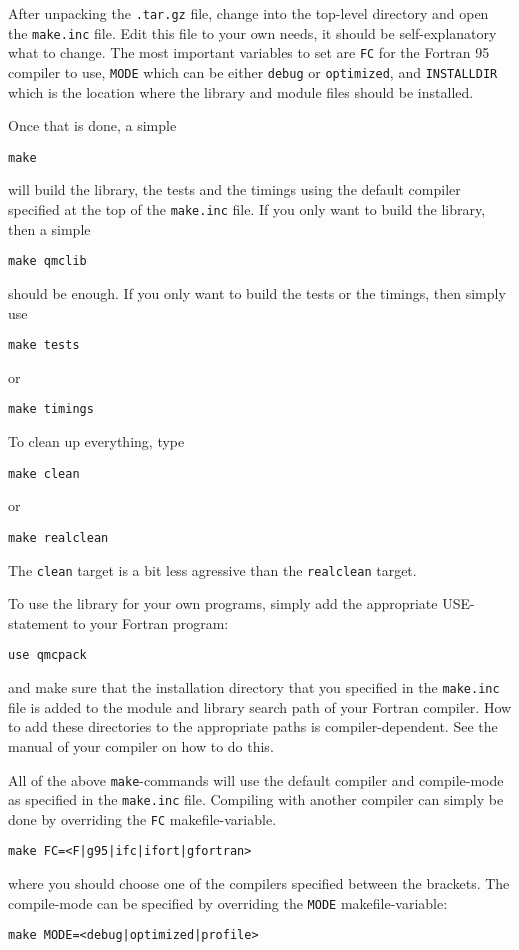 After unpacking the \verb!.tar.gz! file, change into the top-level directory
and open the \verb|make.inc| file.  Edit this file to your own needs, it should
be self-explanatory what to change.  The most important variables to set are
\verb!FC! for the Fortran 95 compiler to use, \verb!MODE! which can be either
\verb!debug! or \verb!optimized!, and \verb!INSTALLDIR! which is the location
where the library and module files should be installed.

Once that is done, a simple
\begin{verbatim}
make
\end{verbatim}
will build the library, the tests and the timings using the default compiler
specified at the top of the \verb!make.inc! file.
If you only want to build the library, then a simple
\begin{verbatim}
make qmclib
\end{verbatim}
should be enough.  If you only want to build the tests or the timings, then
simply use
\begin{verbatim}
make tests
\end{verbatim}
or
\begin{verbatim}
make timings
\end{verbatim}
To clean up everything, type
\begin{verbatim}
make clean
\end{verbatim}
or
\begin{verbatim}
make realclean
\end{verbatim}
The \verb!clean! target is a bit less agressive than the \verb!realclean!
target.

To use the \qmcpack{} library for your own programs, simply add the appropriate
USE-statement to your Fortran program:
\begin{verbatim}
use qmcpack
\end{verbatim}
and make sure that the \qmcpack{} installation directory that you specified in
the \verb!make.inc! file is added to the module and
library search path of your Fortran compiler.  How to add these directories to the appropriate paths is
compiler-dependent.  See the manual of your compiler on how to do this.

All of the above \verb!make!-commands will use the default compiler and
compile-mode as specified in the \verb!make.inc! file.
Compiling with another compiler can simply be done by overriding the \verb!FC!
makefile-variable.
\begin{verbatim}
make FC=<F|g95|ifc|ifort|gfortran>
\end{verbatim}
where you should choose one of the compilers specified between the brackets.
The compile-mode can be specified by overriding the \verb!MODE!
makefile-variable:
\begin{verbatim}
make MODE=<debug|optimized|profile>
\end{verbatim}

